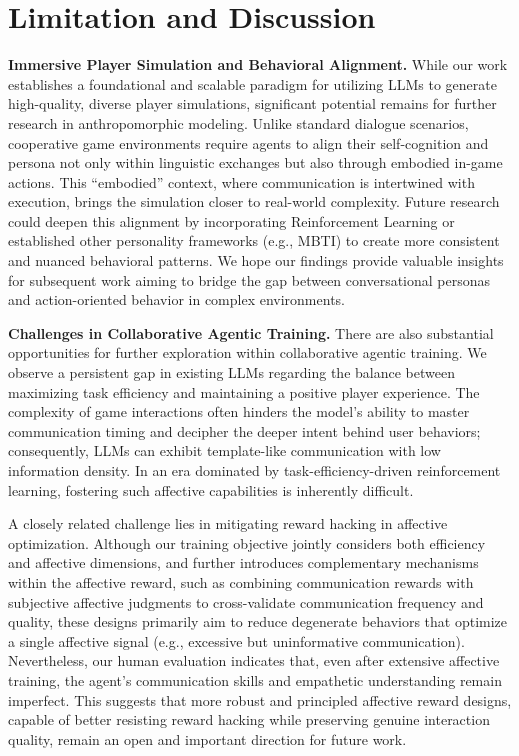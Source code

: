 \documentclass{article}
\theoremstyle{plain}
\theoremstyle{definition}
\theoremstyle{remark}
\begin{document}
\section{Limitation and Discussion}

\textbf{Immersive Player Simulation and Behavioral Alignment.} While our work establishes a foundational and scalable paradigm for utilizing LLMs to generate high-quality, diverse player simulations, significant potential remains for further research in anthropomorphic modeling. Unlike standard dialogue scenarios, cooperative game environments require agents to align their self-cognition and persona not only within linguistic exchanges but also through embodied in-game actions. This ``embodied'' context, where communication is intertwined with execution, brings the simulation closer to real-world complexity. Future research could deepen this alignment by incorporating Reinforcement Learning or established other personality frameworks (e.g., MBTI) to create more consistent and nuanced behavioral patterns. We hope our findings provide valuable insights for subsequent work aiming to bridge the gap between conversational personas and action-oriented behavior in complex environments.

\textbf{Challenges in Collaborative Agentic Training.} There are also substantial opportunities for further exploration within collaborative agentic training. We observe a persistent gap in existing LLMs regarding the balance between maximizing task efficiency and maintaining a positive player experience. The complexity of game interactions often hinders the model’s ability to master communication timing and decipher the deeper intent behind user behaviors; consequently, LLMs can exhibit template-like communication with low information density. In an era dominated by task-efficiency-driven reinforcement learning, fostering such affective capabilities is inherently difficult.

A closely related challenge lies in mitigating reward hacking in affective optimization. Although our training objective jointly considers both efficiency and affective dimensions, and further introduces complementary mechanisms within the affective reward, such as combining communication rewards with subjective affective judgments to cross-validate communication frequency and quality, these designs primarily aim to reduce degenerate behaviors that optimize a single affective signal (e.g., excessive but uninformative communication). Nevertheless, our human evaluation indicates that, even after extensive affective training, the agent’s communication skills and empathetic understanding remain imperfect. This suggests that more robust and principled affective reward designs, capable of better resisting reward hacking while preserving genuine interaction quality, remain an open and important direction for future work.
\end{document}
